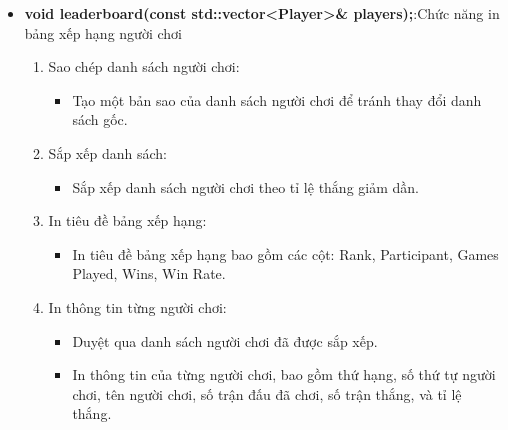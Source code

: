 \documentclass{article}
\begin{document}
\begin{itemize}
    \item \textbf{void leaderboard(const std::vector<Player>\& players);}:Chức năng in bảng xếp hạng người chơi
    \begin{description}
            \begin{enumerate}
            \item Sao chép danh sách người chơi:
                \begin{itemize}
                    \item Tạo một bản sao của danh sách người chơi để tránh thay đổi danh sách gốc.
                \end{itemize}
            \item Sắp xếp danh sách:
                \begin{itemize}
                    \item Sắp xếp danh sách người chơi theo tỉ lệ thắng giảm dần.
                \end{itemize}
            \item In tiêu đề bảng xếp hạng:
                \begin{itemize}
                    \item In tiêu đề bảng xếp hạng bao gồm các cột: Rank, Participant, Games Played, Wins, Win Rate.
                \end{itemize}
            \item In thông tin từng người chơi:
                \begin{itemize}
                    \item Duyệt qua danh sách người chơi đã được sắp xếp.
                    \item In thông tin của từng người chơi, bao gồm thứ hạng, số thứ tự người chơi, tên người chơi, số trận đấu đã chơi, số trận thắng, và tỉ lệ thắng.
                \end{itemize}
        \end{enumerate}
    \end{description}
    

\end{itemize}
\end{document}
